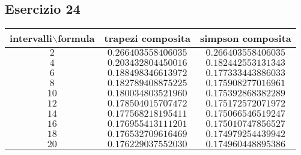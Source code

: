 \subsection{Esercizio 24}
\begin{tabular}{|c c c |}
    \hline
    intervalli$\backslash$formula & trapezi composita        &simpson composita\\
    \hline
    $2$                           &$0.266403558406035$        &$0.266403558406035$ \\
    \hline
    $4$                           &$0.203432804450016$        &$0.182442553131343$ \\
    \hline
    $6$                           &$0.188498346613972$        &$0.177333443886033$ \\
    \hline
    $8$                           &$0.182789408875225$        &$0.175908277016961$ \\
    \hline
    $10$                          &$0.180034803521960$        &$0.175392868382289$ \\
    \hline
    $12$                          &$0.178504015707472$        &$0.175172572071972$ \\
    \hline
    $14$                          &$0.177568218195411$        &$0.175066546519247$ \\
    \hline
    $16$                          &$0.176955413111201$        &$0.175010747856527$ \\
    \hline
    $18$                          &$0.176532709616469$        &$0.174979254439942$ \\
    \hline
    $20$                          &$0.176229037552030$        &$0.174960448895386$ \\
    \hline
\end{tabular}

